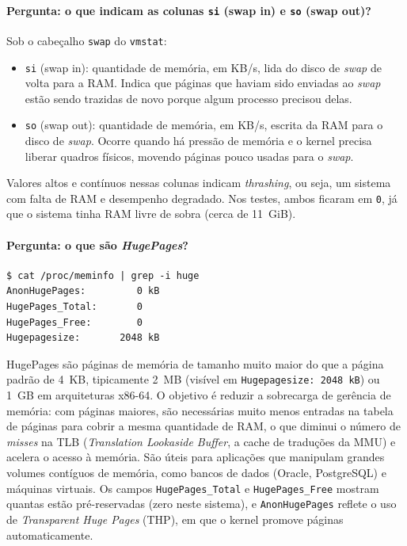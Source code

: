 \documentclass[11pt,a4paper]{article}
\begin{document}
\paragraph{Pergunta: o que indicam as colunas \texttt{si} (swap in) e \texttt{so} (swap out)?}
Sob o cabeçalho \texttt{swap} do \texttt{vmstat}:
\begin{itemize}[nosep]
    \item \texttt{si} (swap in): quantidade de memória, em KB/s, lida do disco de \emph{swap} de
    volta para a RAM. Indica que páginas que haviam sido enviadas ao \emph{swap} estão sendo trazidas
    de novo porque algum processo precisou delas.
    \item \texttt{so} (swap out): quantidade de memória, em KB/s, escrita da RAM para o disco de
    \emph{swap}. Ocorre quando há pressão de memória e o kernel precisa liberar quadros físicos,
    movendo páginas pouco usadas para o \emph{swap}.
\end{itemize}
Valores altos e contínuos nessas colunas indicam \emph{thrashing}, ou seja, um sistema com falta de
RAM e desempenho degradado. Nos testes, ambos ficaram em \texttt{0}, já que o sistema tinha RAM livre
de sobra (cerca de 11~GiB).

\paragraph{Pergunta: o que são \emph{HugePages}?}
\begin{lstlisting}[style=bashstyle]
$ cat /proc/meminfo | grep -i huge
AnonHugePages:         0 kB
HugePages_Total:       0
HugePages_Free:        0
Hugepagesize:       2048 kB
\end{lstlisting}
HugePages são páginas de memória de tamanho muito maior do que a página padrão de 4~KB, tipicamente
2~MB (visível em \texttt{Hugepagesize: 2048 kB}) ou 1~GB em arquiteturas x86-64. O objetivo é reduzir
a sobrecarga de gerência de memória: com páginas maiores, são necessárias muito menos entradas na
tabela de páginas para cobrir a mesma quantidade de RAM, o que diminui o número de \emph{misses} na
TLB (\emph{Translation Lookaside Buffer}, a cache de traduções da MMU) e acelera o acesso à memória.
São úteis para aplicações que manipulam grandes volumes contíguos de memória, como bancos de dados
(Oracle, PostgreSQL) e máquinas virtuais. Os campos \texttt{HugePages\_Total} e
\texttt{HugePages\_Free} mostram quantas estão pré-reservadas (zero neste sistema), e
\texttt{AnonHugePages} reflete o uso de \emph{Transparent Huge Pages} (THP), em que o kernel promove
páginas automaticamente.
\end{document}
